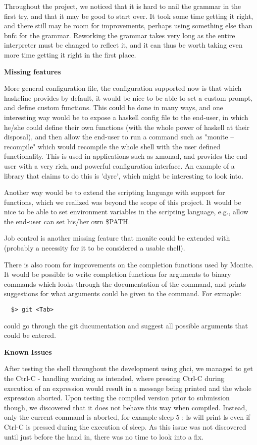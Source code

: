 \documentclass[11pt,a4paper]{article}
\begin{document}
Throughout the project, we noticed that it is hard to nail the grammar in the
first try, and that it may be good to start over. It took some time getting it
right, and there still may be room for improvements, perhaps using something
else than bnfc for the grammar. Reworking the grammar takes very long as the
entire interpreter must be changed to reflect it, and it can thus be worth
taking even more time getting it right in the first place.

\textbf{Missing features}

More general configuration file, the configuration supported now is that which
haskeline provides by default, it would be nice to be able to set a custom
prompt, and define custom functions. This could be done in many ways, and one
interesting way would be to expose a haskell config file to the end-user, in
which he/she could define their own functions (with the whole power of haskell
at their disposal), and then allow the end-user to run a command such as "monite
--recompile" which would recompile the whole shell with the user defined
functionality. This is used in applications such as xmonad, and provides the
end-user with a very rich, and powerful configuration interface. An example of a
library that claims to do this is 'dyre', which might be interesting to look
into.

Another way would be to extend the scripting language with support for
functions, which we realized was beyond the scope of this project. It would be
nice to be able to set environment variables in the scripting language, e.g.,
allow the end-user can set his/her own \$PATH.

Job control is another missing feature that monite could be extended with
(probably a necessity for it to be considered a usable shell).

There is also room for improvements on the completion functions used by Monite.
It would be possible to write completion functions for arguments to binary
commands which looks through the documentation of the command, and prints
suggestions for what arguments could be given to the command. For exmaple:

\begin{verbatim}
  $> git <Tab>
\end{verbatim}

could go through the git ducumentation and suggest all possible arguments that
could be entered.

\textbf{Known Issues}

After testing the shell throughout the development using ghci, we managed to
get the Ctrl-C - handling working as intended, where pressing Ctrl-C during
execution of an expression would result in a message being printed and the
whole expression aborted. Upon testing the compiled version prior to submission
though, we discovered that it does not behave this way when compiled. Instead,
only the current command is aborted, for example sleep 5 ; ls will print ls
even if Ctrl-C is pressed during the execution of sleep. As this issue was not
discovered until just before the hand in, there was no time to look into a fix.
\end{document}
